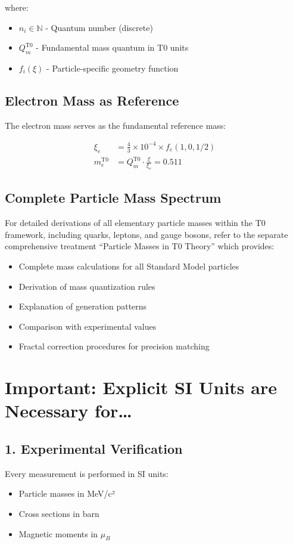 	where:
	\begin{itemize}
		\item $n_i \in \mathbb{N}$ - Quantum number (discrete)
		\item $Q_m^{\mathrm{T0}}$ - Fundamental mass quantum in T0 units
		\item $f_i(\xi)$ - Particle-specific geometry function
	\end{itemize}
	
	\subsection{Electron Mass as Reference}
	
	The electron mass serves as the fundamental reference mass:
	
	\begin{align}
		\xi_e &= \frac{4}{3} \times 10^{-4} \times f_e(1,0,1/2) \\
		m_e^{\mathrm{T0}} &= Q_m^{\mathrm{T0}} \cdot \frac{\xi}{\xi_e} = 0.511
	\end{align}
	
	\subsection{Complete Particle Mass Spectrum}
	
	For detailed derivations of all elementary particle masses within the T0 framework, including quarks, leptons, and gauge bosons, refer to the separate comprehensive treatment ``Particle Masses in T0 Theory'' which provides:
	
	\begin{itemize}
		\item Complete mass calculations for all Standard Model particles
		\item Derivation of mass quantization rules
		\item Explanation of generation patterns
		\item Comparison with experimental values
		\item Fractal correction procedures for precision matching
	\end{itemize}
	
	\section{Important: Explicit SI Units are Necessary for\dots}
	\label{sec:si-notwendig}
	
	\subsection{1. Experimental Verification}
	Every measurement is performed in SI units:
	\begin{itemize}
		\item Particle masses in MeV/c²
		\item Cross sections in barn
		\item Magnetic moments in $\mu_B$
	\end{itemize}
	
